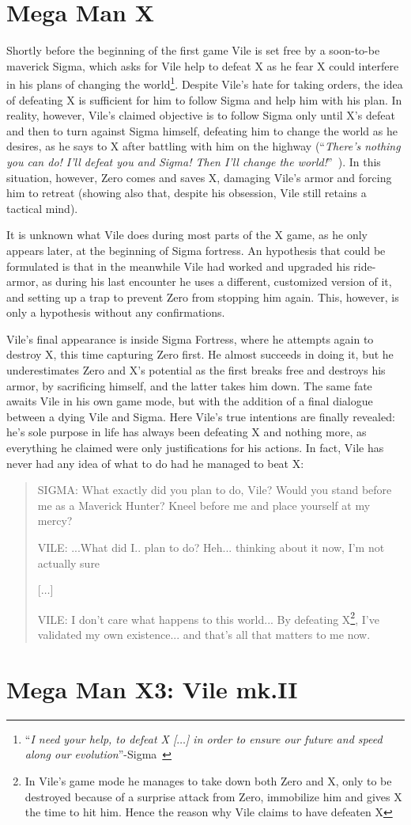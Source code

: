 \section{Mega Man X}
Shortly before the beginning of the first game Vile is set free by a soon-to-be maverick Sigma, which asks for Vile help to defeat X as he fear X could interfere in his plans of changing the world\footnote{``\textit{I need your help, to defeat X [$\dots$] in order to ensure our future and speed along our evolution}''-Sigma~\cite{MHX:Vile_script}}. Despite Vile's hate for taking orders, the idea of defeating X is sufficient for him to follow Sigma and help him with his plan. In reality, however, Vile's claimed objective is to follow Sigma only until X's defeat and then to turn against Sigma himself, defeating him to change the world as he desires, as he says to X after battling with him on the highway (``\textit{There's nothing you can do! I'll defeat you and Sigma! Then I'll change the world!}''~\cite{wiki:MM_MHX_script}). In this situation, however, Zero comes and saves X, damaging Vile's armor and forcing him to retreat (showing also that, despite his obsession, Vile still retains a tactical mind). 

It is unknown what Vile does during most parts of the X game, as he only appears later, at the beginning of Sigma fortress. An hypothesis that could be  formulated is that in the meanwhile Vile had worked and upgraded his ride-armor, as during his last encounter he uses a different, customized version of it, and setting up a trap to prevent Zero from stopping him again. This, however, is only a hypothesis without any confirmations.

Vile's final appearance is inside Sigma Fortress, where he attempts again to destroy X, this time capturing Zero first. He almost succeeds in doing it, but he underestimates Zero and X's potential as the first breaks free and destroys his armor, by sacrificing himself, and the latter takes him down. The same fate awaits Vile in his own game mode, but with the addition of a final dialogue between a dying Vile and Sigma. Here Vile's true intentions are finally revealed: he's sole purpose in life has always been defeating X and nothing more, as everything he claimed were only justifications for his actions. In fact, Vile has never had any idea of what to do had he managed to beat X:
\begin{quote}
	SIGMA: What exactly did you plan to do, Vile? Would you stand before me as a Maverick Hunter? Kneel before me and place yourself at my mercy?
	
	VILE: ...What did I.. plan to do? Heh... thinking about it now, I'm not actually sure
	
	[$\dots$]
	
	VILE: I don't care what happens to this world... By defeating X\footnote{In Vile's game mode he manages to take down both Zero and X, only to be destroyed because of a surprise attack from Zero, immobilize him and gives X the time to hit him. Hence the reason why Vile claims to have defeaten X}, I've validated
	my own existence... and that's all that matters to me now.
\end{quote}

\section{Mega Man X3: Vile mk.II}